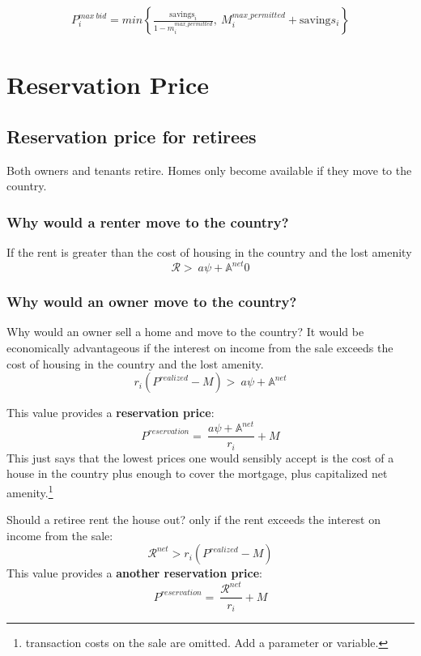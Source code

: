 {{\begin{align}
P_i^{max\ bid}= min \left\{\frac{\mathrm{savings}_i}{1-m_i^{max\_permitted}},\  M_i^{max\_permitted} + \mathrm{saving}s_i  \right\}   \nonumber  
\end{align}


\section{Reservation Price}



\subsection{Reservation price for retirees}
Both owners and tenants retire. Homes only become available if they move to the country. 



\subsubsection{Why would a renter move to the country?} 
If the rent is greater than the cost of housing in the country and the lost amenity
\[\mathcal{R} > \ a\psi+ \mathbb{A}^{net}0\]

\subsubsection{Why would an owner move to the country?}
Why would an owner sell a home and move to the country? It would be economically advantageous if the interest on income from the sale exceeds the cost of housing in the country and the lost amenity.
\[r_i(P^{realized}-M) >\ a\psi+ \mathbb{A}^{net}\label{eq:movers-gainA}\]

This value provides a \textbf{reservation price}: 
\[P^{reservation} =\ \frac{a\psi+ \mathbb{A}^{net}}{r_i}+M \label{eq:movers-gainB}\]
This just says that the lowest prices one would sensibly accept is the cost of a house in the country plus enough to cover the mortgage, plus capitalized net amenity.\footnote{transaction costs on the sale are omitted. Add a parameter or variable.}

Should a retiree rent the house out? only if the rent exceeds the  interest on income from the sale:
\[\mathcal{R}^{net}>r_i(P^{realized}-M)\]
This value provides a \textbf{another reservation price}: 
\[P^{reservation} =\ \frac{\mathcal{R}^{net}}{r_i}+M \label{eq:movers-gainC}\]


}}
